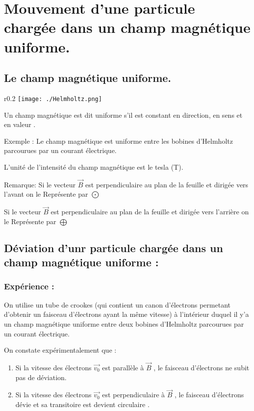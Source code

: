 \documentclass[12pt]{article}
\begin{document}
\section{Mouvement d'une particule chargée dans un champ magnétique
uniforme.}
\subsection{Le champ magnétique uniforme.}

\begin{wrapfigure}{r}{0.2\textwidth}
	\texttt{[image: ./Helmholtz.png]}
\end{wrapfigure}
Un champ magnétique est dit uniforme s'il est constant en direction, en sens et en valeur .

Exemple : Le champ magnétique est uniforme entre les bobines d'Helmholtz parcourues par un courant électrique.

L'unité de l'intensité du champ magnétique est le tesla (T). 

Remarque: Si le vecteur $\vec{B}$ est perpendiculaire au plan de la feuille et dirigée vers l'avant on le Représente par $\bigodot$

Si le vecteur $\vec{B}$ est perpendiculaire au plan de la feuille et dirigée vers l'arrière on le Représente par $\bigoplus$

\subsection{Déviation d'unr particule chargée dans un champ magnétique uniforme : }


\subsubsection{Expérience : }
On utilise un tube de crookes (qui contient un canon d'électrons permetant d'obtenir un faisceau d'électrons ayant la même
vitesse) à l'intérieur duquel il y'a un champ magnétique uniforme entre deux bobines d'Helmholtz parcourues par un courant
électrique.

On constate expérimentalement que : 

\begin{enumerate}

 \item Si la vitesse des électrons $\vec{v_0}$ est parallèle à $\vec{B}$ , le faisceau d'électrons ne subit pas de déviation.

 \item Si la vitesse des électrons $\vec{v_0}$ est perpendiculaire à $\vec{B}$ , le faisceau d'électrons dévie et sa transitoire est devient circulaire . 
\end{enumerate}
\end{document}

